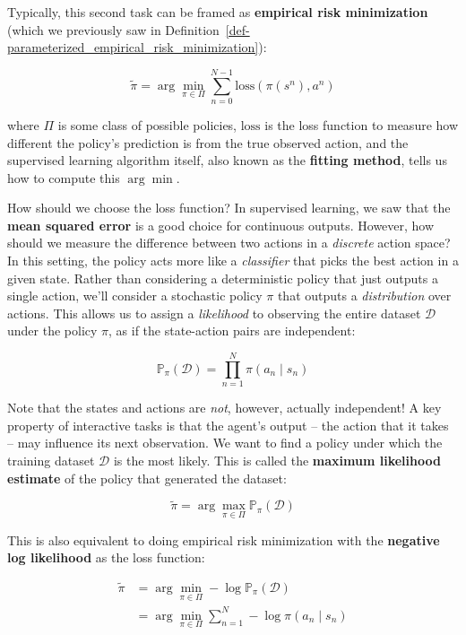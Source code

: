 \documentclass[
  letterpaper,
  DIV=11,
  numbers=noendperiod]{scrreprt}
\theoremstyle{plain}
\theoremstyle{plain}
\theoremstyle{definition}
\theoremstyle{definition}
\theoremstyle{remark}
\begin{document}
Typically, this second task can be framed as \textbf{empirical risk
minimization} (which we previously saw in
Definition~\ref{def-parameterized_empirical_risk_minimization}):

\[
\widetilde{\pi} = \arg\min_{\pi \in \Pi} \sum_{n=0}^{N-1} \text{loss}(\pi(s^n), a^n)
\]

where \(\Pi\) is some class of possible policies, \(\text{loss}\) is the
loss function to measure how different the policy's prediction is from
the true observed action, and the supervised learning algorithm itself,
also known as the \textbf{fitting method}, tells us how to compute this
\(\arg\min\).

How should we choose the loss function? In supervised learning, we saw
that the \textbf{mean squared error} is a good choice for continuous
outputs. However, how should we measure the difference between two
actions in a \emph{discrete} action space? In this setting, the policy
acts more like a \emph{classifier} that picks the best action in a given
state. Rather than considering a deterministic policy that just outputs
a single action, we'll consider a stochastic policy \(\pi\) that outputs
a \emph{distribution} over actions. This allows us to assign a
\emph{likelihood} to observing the entire dataset \(\mathcal{D}\) under
the policy \(\pi\), as if the state-action pairs are independent:

\[
\mathbb{P}_\pi(\mathcal{D}) = \prod_{n=1}^{N} \pi(a_n \mid s_n)
\]

Note that the states and actions are \emph{not}, however, actually
independent! A key property of interactive tasks is that the agent's
output -- the action that it takes -- may influence its next
observation. We want to find a policy under which the training dataset
\(\mathcal{D}\) is the most likely. This is called the \textbf{maximum
likelihood estimate} of the policy that generated the dataset:

\[
\widetilde{\pi} = \arg\max_{\pi \in \Pi} \mathbb{P}_{\pi}(\mathcal{D})
\]

This is also equivalent to doing empirical risk minimization with the
\textbf{negative log likelihood} as the loss function:

\[
\begin{aligned}
\widetilde{\pi} &= \arg\min_{\pi \in \Pi} - \log \mathbb{P}_\pi(\mathcal{D}) \\
&= \arg\min_{\pi \in \Pi} \sum_{n=1}^N - \log \pi(a_n \mid s_n)
\end{aligned}
\]
\end{document}
